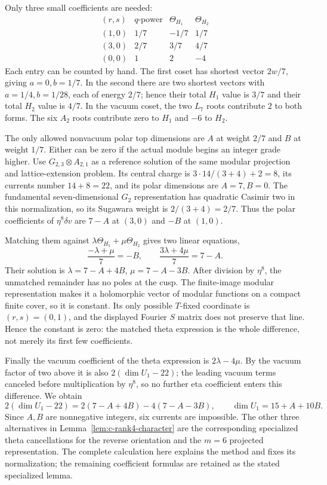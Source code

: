Only three small coefficients are needed:
\[
\begin{array}{c|c|r|r}
 (r,s)&q\text{-power}&\Theta_{H_1}&\Theta_{H_2}\\\hline
 (1,0)&1/7&-1/7&1/7\\
 (3,0)&2/7&3/7&4/7\\
 (0,0)&1&2&-4
\end{array}
\]
Each entry can be counted by hand. The first coset has shortest
vector $2w/7$, giving $a=0,b=1/7$. In the second there are
two shortest vectors with $a=1/4,b=1/28$, each of energy
$2/7$; hence their total $H_1$ value is $3/7$ and their
total $H_2$ value is $4/7$. In the vacuum coset, the two
$L_7$ roots contribute $2$ to both forms. The six $A_2$
roots contribute zero to $H_1$ and $-6$ to $H_2$.

The only allowed nonvacuum polar top dimensions are $A$ at
weight $2/7$ and $B$ at weight $1/7$. Either can be zero
if the actual module begins an integer grade higher. Use
$G_{2,3}\otimes A_{2,1}$ as a reference solution of the same
modular projection and lattice-extension problem. Its central
charge is $3\cdot14/(3+4)+2=8$, its currents number
$14+8=22$, and its polar dimensions are $A=7,B=0$.
The fundamental seven-dimensional $G_2$ representation has
quadratic Casimir two in this normalization, so its Sugawara
weight is $2/(3+4)=2/7$.
Thus the polar coefficients of $\eta^8\delta v$ are
$7-A$ at $(3,0)$ and $-B$ at $(1,0)$.

Matching them against
$\lambda\Theta_{H_1}+\mu\Theta_{H_2}$ gives two linear
equations,
\[
 \frac{-\lambda+\mu}{7}=-B,\qquad
 \frac{3\lambda+4\mu}{7}=7-A.
\]
Their solution is
$\lambda=7-A+4B$, $\mu=7-A-3B$.
After division by $\eta^8$, the unmatched remainder has no
poles at the cusp. The finite-image modular representation
makes it a holomorphic vector of modular functions on a compact
finite cover, so it is constant. Its only possible $T$-fixed
coordinate is $(r,s)=(0,1)$, and the displayed Fourier $S$
matrix does not preserve that line. Hence the constant is zero:
the matched theta expression is the whole difference, not merely
its first few coefficients.

Finally the vacuum coefficient of the theta expression is
$2\lambda-4\mu$. By the vacuum factor of two above it is also
$2(\dim U_1-22)$; the leading vacuum terms canceled before
multiplication by $\eta^8$, so no further eta coefficient
enters this difference. We obtain
\[
 2(\dim U_1-22)
 =2(7-A+4B)-4(7-A-3B),
 \qquad \dim U_1=15+A+10B.
\]
Since $A,B$ are nonnegative integers, six currents are impossible.
The other three alternatives in Lemma~\ref{lem:c-rank4-character}
are the corresponding specialized theta cancellations for the reverse
orientation and the $m=6$ projected representation. The complete
calculation here explains the method and fixes its normalization;
the remaining coefficient formulas are retained as the stated
specialized lemma.

